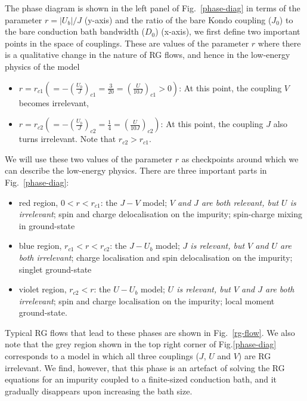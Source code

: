 \documentclass{iopart}
\begin{document}
The phase diagram is shown in the left panel of Fig.~\eqref{phase-diag} in terms of the parameter $r=|U_{b}|/J$ (y-axis) and the ratio of the bare Kondo coupling ($J_{0}$) to the bare conduction bath bandwidth ($D_{0}$) (x-axis), we first define two important points in the space of couplings. These are values of the parameter \(r\) where there is a qualitative change in the nature of RG flows, and hence in the low-energy physics of the model
\begin{itemize}
	\item \(r = r_{c1} \left(= -\left(\frac{U_b}{J}\right)_{c1} = \frac{3}{20} = \left(\frac{U}{10 J}\right)_{c1}>0\right)\): At this point, the coupling \(V\) becomes irrelevant,
	\item \(r = r_{c2} \left(= -\left(\frac{U_b}{J}\right)_{c2} = \frac{1}{4} = \left(\frac{U}{10 J}\right)_{c2}\right)\): At this point, the coupling \(J\) also turns irrelevant. Note that $r_{c2} > r_{c1}$.
\end{itemize}
We will use these two values of the parameter $r$ as checkpoints around which we can describe the low-energy physics. 
There are three important parts in Fig.~\eqref{phase-diag}:
\begin{itemize}
	\item red region, \(0 < r < r_{c1}\): the \(J-V\) model; {\it \(V\) and \(J\) are both relevant, but $U$ is irrelevant}; spin and charge delocalisation on the impurity; spin-charge mixing in ground-state
	\item blue region, \(r_{c1} < r < r_{c2}\): the \(J-U_b\) model; {\it $J$ is relevant, but \(V\) and $U$ are both irrelevant}; charge localisation and spin delocalisation on the impurity; singlet ground-state
	\item violet region, \(r_{c2} < r\): the \(U-U_b\) model; {\it $U$ is relevant, but \(V\) and \(J\) are both irrelevant}; spin and charge localisation on the impurity; local moment ground-state.
\end{itemize}
Typical RG flows that lead to these phases are shown in Fig.~\eqref{rg-flow}. We also note that the grey region shown in the top right corner of Fig.\eqref{phase-diag} corresponds to a model in which all three couplings ($J$, $U$ and $V$) are RG irrelevant. We find, however, that this phase is an artefact of solving the RG equations for an impurity coupled to a finite-sized conduction bath, and it gradually disappears upon increasing the bath size.
\end{document}
